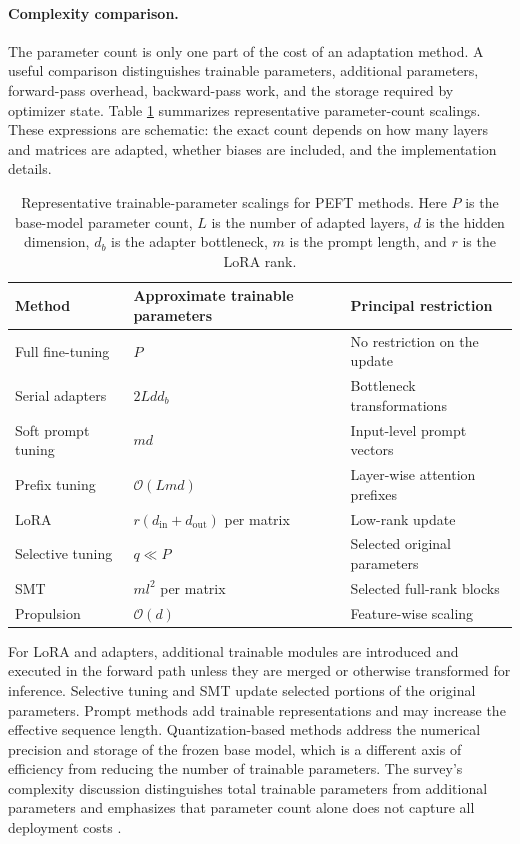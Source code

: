 \paragraph{Complexity comparison.}
The parameter count is only one part of the cost of an adaptation method.
A useful comparison distinguishes trainable parameters, additional
parameters, forward-pass overhead, backward-pass work, and the storage
required by optimizer state. Table \ref{tab:peft-complexity} summarizes
representative parameter-count scalings. These expressions are schematic:
the exact count depends on how many layers and matrices are adapted, whether
biases are included, and the implementation details.

\begin{table}[htbp]
    \centering
    \caption{Representative trainable-parameter scalings for PEFT methods.
    Here $P$ is the base-model parameter count, $L$ is the number of adapted
    layers, $d$ is the hidden dimension, $d_b$ is the adapter bottleneck,
    $m$ is the prompt length, and $r$ is the LoRA rank.}
    \label{tab:peft-complexity}
    \begin{tabularx}{\textwidth}{lXX}
        \toprule
        Method & Approximate trainable parameters & Principal restriction \\
        \midrule
        Full fine-tuning & $P$ & No restriction on the update \\
        Serial adapters & $2Ldd_b$ & Bottleneck transformations \\
        Soft prompt tuning & $md$ & Input-level prompt vectors \\
        Prefix tuning & $\mathcal{O}(Lmd)$ & Layer-wise attention prefixes \\
        LoRA & $r(d_{\mathrm{in}}+d_{\mathrm{out}})$ per matrix & Low-rank update \\
        Selective tuning & $q\ll P$ & Selected original parameters \\
        SMT & $ml^2$ per matrix & Selected full-rank blocks \\
        Propulsion & $\mathcal{O}(d)$ & Feature-wise scaling \\
        \bottomrule
    \end{tabularx}
\end{table}

For LoRA and adapters, additional trainable modules are introduced and
executed in the forward path unless they are merged or otherwise transformed
for inference. Selective tuning and SMT update selected portions of the
original parameters. Prompt methods add trainable representations and may
increase the effective sequence length. Quantization-based methods address
the numerical precision and storage of the frozen base model, which is a
different axis of efficiency from reducing the number of trainable
parameters. The survey's complexity discussion distinguishes total
trainable parameters from additional parameters and emphasizes that
parameter count alone does not capture all deployment costs
\parencite{prottasha2025peft}.

